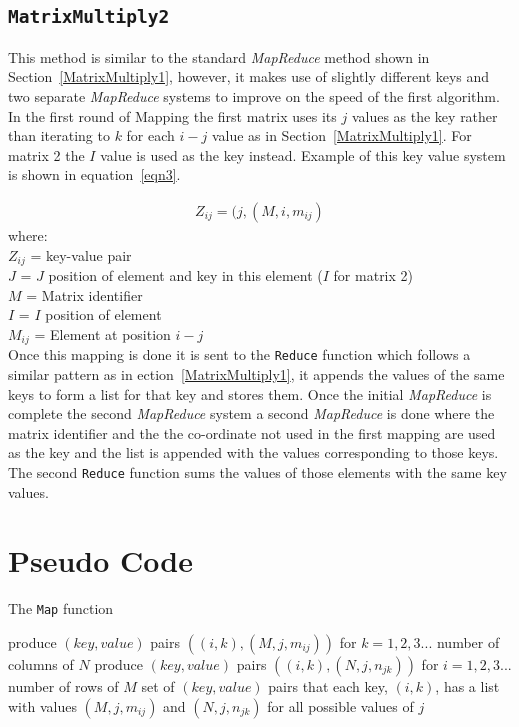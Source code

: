 \documentclass[10pt, conference]{IEEEtran}
\def\code#1{\texttt{#1}}
\begin{document}
\subsection{\code{MatrixMultiply2}}
\label{MatrixMultiply2}
This method is similar to the standard \emph{MapReduce} method shown in Section~\ref{MatrixMultiply1}, however, it makes use of slightly different keys and two separate \emph{MapReduce} systems to improve on the speed of the first algorithm.\\

In the first round of Mapping the first matrix uses its $j$ values as the key rather than iterating to $k$ for each $i-j$ value as in Section~\ref{MatrixMultiply1}. For matrix 2 the $I$ value is used as the key instead. Example of this key value system is shown in equation~\ref{eqn3}.

\begin{equation}
\label{eqn3}
\begin{split}
Z_{ij} = (j,(M,i, m_{ij})
\end{split}
\end{equation}
where:\\
$Z_{ij}$  =  key-value pair\\
$J$ = $J$ position of element and key in this element ($I$ for matrix 2)\\
$M$ = Matrix identifier\\
$I$ = $I$ position of element\\
$M_{ij}$ = Element at position $i-j$\\

Once this mapping is done it is sent to the \code{Reduce} function which follows a similar pattern as in ection~\ref{MatrixMultiply1}, it appends the values of the same keys to form a list for that key and stores them. 
Once the initial \emph{MapReduce} is complete the second \emph{MapReduce} system a second \emph{MapReduce} is done where the matrix identifier and the the co-ordinate not used in the first mapping are used as the key and the list is appended with the values corresponding to those keys. 
The second \code{Reduce} function sums the values of those elements with the same key values.

\section{Pseudo Code}
\label{Pseudo Code}

\begin{algorithm}[h!]
\caption{The \code{Map} function~\cite{lendapp}}
\label{Map Algorithm}
\begin{algorithmic} 
	\STATE produce $(key,value)$ pairs $((i,k),(M,j,m_{ij}))$ for $k = 1,2,3...$ number of columns of $N$
\ENDFOR
{}
	\STATE produce $(key,value)$ pairs $((i,k),(N,j,n_{jk}))$ for $i = 1,2,3...$ number of rows of $M$
\ENDFOR
\RETURN set of $(key,value)$ pairs that each key, $(i,k)$, has a list with values $(M,j,m_{ij})$ and $(N,j,n_{jk})$ for all possible values of $j$

\end{algorithmic}
\end{algorithm}
\end{document}
